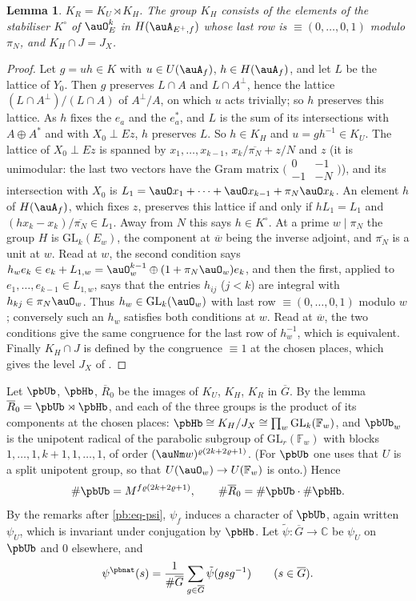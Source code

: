 \documentclass[10pt]{amsart}
\newtheorem{lemma}[theorem]{Lemma}
\theoremstyle{definition}
\theoremstyle{remark}
\newcommand{\C}{\mathbb C}
\providecommand{\auF}{\mathbb F}
\providecommand{\auG}{\overline G}
\providecommand{\auGL}{\mathrm{GL}}
\providecommand{\aubar}[1]{\overline{#1}}
\providecommand{\pbR}{\overline R_0}
\begin{document}
\begin{lemma}\label{pb:KR}
$K_R=K_U\rtimes K_H$. The group $K_H$ consists of the elements of the stabiliser $K^\circ$ of
$\auO_E^k$ in $H(\auA_{E^+,f})$ whose last row is $\equiv(0,\dots,0,1)$ modulo $\pi_N$, and
$K_H\cap J=J_X$.
\end{lemma}
\begin{proof}
Let $g=uh\in K$ with $u\in U(\auA_f)$, $h\in H(\auA_f)$, and let $L$ be the lattice of $Y_0$. Then
$g$ preserves $L\cap A$ and $L\cap A^\perp$, hence the lattice $(L\cap A^\perp)/(L\cap A)$ of
$A^\perp/A$, on which $u$ acts trivially; so $h$ preserves this lattice. As $h$ fixes the $e_a$
and the $e_a^*$, and $L$ is the sum of its intersections with $A\oplus A^*$ and with $X_0\perp Ez$,
$h$ preserves $L$. So $h\in K_H$ and $u=gh^{-1}\in K_U$. The lattice of $X_0\perp Ez$ is spanned
by $x_1,\dots,x_{k-1}$, $x_k/\aubar{\pi_N}+z/N$ and $z$ (it is unimodular: the last two vectors
have the Gram matrix $\bigl(\begin{smallmatrix}0&-1\\-1&-N\end{smallmatrix}\bigr)$), and its
intersection with $X_0$ is $L_1=\auO x_1+\dots+\auO x_{k-1}+\pi_N\auO x_k$. An element $h$ of
$H(\auA_f)$, which fixes $z$, preserves this lattice if and only if $hL_1=L_1$ and $(hx_k-x_k)/
\aubar{\pi_N}\in L_1$. Away from $N$ this says $h\in K^\circ$. At a prime $w\mid\pi_N$ the group
$H$ is $\auGL_k(E_w)$, the component at $\aubar w$ being the inverse adjoint, and $\aubar{\pi_N}$
is a unit at $w$. Read at $w$, the second condition says $h_we_k\in e_k+L_{1,w}=\auO_w^{k-1}\oplus
(1+\pi_N\auO_w)e_k$, and then the first, applied to $e_1,\dots,e_{k-1}\in L_{1,w}$, says that the
entries $h_{ij}$ ($j<k$) are integral with $h_{kj}\in\pi_N\auO_w$. Thus $h_w\in\auGL_k(\auO_w)$ with
last row $\equiv(0,\dots,0,1)$ modulo $w$; conversely such an $h_w$ satisfies both conditions at $w$.
Read at $\aubar w$, the two conditions give the same congruence for the last row of $h_w^{-1}$,
which is equivalent.
Finally $K_H\cap J$ is defined by the congruence $\equiv1$ at the chosen places, which
gives the level $J_X$ of {\cite[\S14.3]{P46}}.
\end{proof}

Let $\pbUb$, $\pbHb$, $\pbR$ be the images of $K_U$, $K_H$, $K_R$ in $\auG$. By the lemma
$\pbR=\pbUb\rtimes\pbHb$, and each of the three groups is the product of its components at the
chosen places: $\pbHb\cong K_H/J_X\cong\prod_w\auGL_k(\auF_w)$, and $\pbUb_w$ is the unipotent
radical of the parabolic subgroup of $\auGL_r(\auF_w)$ with blocks $1,\dots,1,k+1,1,\dots,1$, of
order $(\auNm w)^{\varrho(2k+2\varrho+1)}$. (For $\pbUb$ one uses that $U$ is a split unipotent
group, so that $U(\auO_w)\to U(\auF_w)$ is onto.) Hence
\begin{equation}\label{pb:eq-orders}
\#\pbUb=M^{f\varrho(2k+2\varrho+1)},\qquad\#\pbR=\#\pbUb\cdot\#\pbHb .
\end{equation}
By the remarks after \eqref{pb:eq-psi}, $\psi_f$ induces a character of $\pbUb$, again written
$\psi_U$, which is invariant under conjugation by $\pbHb$. Let $\tilde\psi\colon\auG\to\C$ be
$\psi_U$ on $\pbUb$ and $0$ elsewhere, and
\[
\psi^{\pbnat}(s)=\frac1{\#\auG}\sum_{g\in\auG}\tilde\psi(gsg^{-1})\qquad(s\in\auG).
\]
\end{document}

